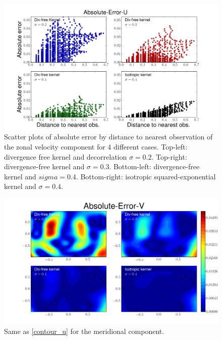 \documentclass[12pt,a4paper]{article}%
\begin{document}
\begin{figure}
\noindent\includegraphics[width=32pc]{plots/Absolute-Error-U-scatter.png}
\caption{Scatter plots of absolute error by distance to nearest observation of 
the zonal velocity component for 4 different cases. Top-left: divergence free kernel and 
decorrelation $\sigma=0.2$. Top-right: divergence-free kernel and 
$\sigma=0.3$. Bottom-left: divergence-free kernel and $sigma=0.4$. Bottom-right: isotropic 
squared-exponential kernel and $\sigma=0.4$.}
\label{scatter_u}
\end{figure}


\begin{figure}
\noindent\includegraphics[width=32pc]{plots/Absolute-Error-V-contour.png}
\caption{Same as \ref{contour_u} for the meridional component.  }
\label{contour_v}
\end{figure}
\end{document}
